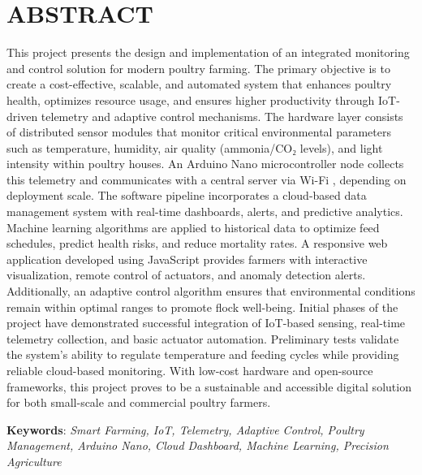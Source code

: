 \documentclass[../main.tex]{subfiles}
\begin{document}
\section*{ABSTRACT}

This project presents the design and implementation of an integrated monitoring and control solution for modern poultry farming. The primary objective is to create a cost-effective, scalable, and automated system that enhances poultry health, optimizes resource usage, and ensures higher productivity through IoT-driven telemetry and adaptive control mechanisms. The hardware layer consists of distributed sensor modules that monitor critical environmental parameters such as temperature, humidity, air quality (ammonia/CO₂ levels), and light intensity within poultry houses. An Arduino Nano microcontroller node collects this telemetry and communicates with a central server via Wi-Fi , depending on deployment scale. The software pipeline incorporates a cloud-based data management system with real-time dashboards, alerts, and predictive analytics. Machine learning algorithms are applied to historical data to optimize feed schedules, predict health risks, and reduce mortality rates. A responsive web application developed using JavaScript provides farmers with interactive visualization, remote control of actuators, and anomaly detection alerts. Additionally, an adaptive control algorithm ensures that environmental conditions remain within optimal ranges to promote flock well-being. Initial phases of the project have demonstrated successful integration of IoT-based sensing, real-time telemetry collection, and basic actuator automation. Preliminary tests validate the system’s ability to regulate temperature and feeding cycles while providing reliable cloud-based monitoring. With low-cost hardware and open-source frameworks, this project proves to be a sustainable and accessible digital solution for both small-scale and commercial poultry farmers.

\textbf{Keywords}: \textit{Smart Farming, IoT, Telemetry, Adaptive Control, Poultry Management, Arduino Nano, Cloud Dashboard, Machine Learning, Precision Agriculture}
\end{document}
